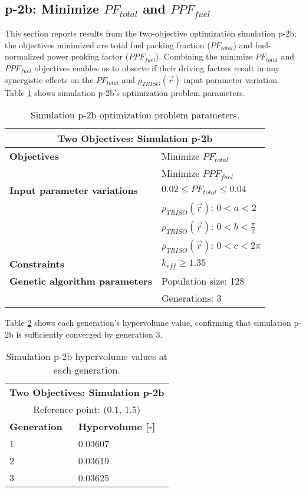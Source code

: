 \subsection{p-2b: Minimize $PF_{total}$ and $PPF_{fuel}$}
\label{sec:p-2b}
This section reports results from the two-objective optimization simulation p-2b; the 
objectives minimized are total fuel packing fraction ($PF_{total}$) and fuel-normalized 
power peaking factor ($PPF_{fuel}$).  
Combining the minimize $PF_{total}$ and $PPF_{fuel}$ objectives enables us to observe if 
their driving factors result in any synergistic effects on the $PF_{total}$ and 
$\rho_{TRISO}(\vec{r})$ input parameter variation. 
Table \ref{tab:simulationp2b} shows simulation p-2b's optimization problem parameters. 
\begin{table}[htbp!]
    \centering
    \onehalfspacing
    \caption{Simulation p-2b optimization problem parameters.}
	\label{tab:simulationp2b}
    \footnotesize
    \begin{tabular}{l|p{4cm}}
    \hline 
    \multicolumn{2}{c}{\textbf{Two Objectives: Simulation p-2b}} \\
    \hline 
    \textbf{Objectives} & Minimize $PF_{total}$ \\
    & Minimize $PPF_{fuel}$ \\
    \hline 
    \textbf{Input parameter variations} & $0.02 \leq PF_{total} \leq 0.04$ \\
    & $\rho_{TRISO}(\vec{r})$: $0<a<2$ \\
    & $\rho_{TRISO}(\vec{r})$: $0<b<\frac{\pi}{2}$ \\
    & $\rho_{TRISO}(\vec{r})$: $0<c<2\pi$ \\
    \hline
    \textbf{Constraints} & $k_{eff} \geq 1.35$\\ 
    \hline 
    \textbf{Genetic algorithm parameters} & Population size: 128 \\
    & Generations: 3 \\
    \hline
    \end{tabular}
\end{table}

Table \ref{tab:p2b-hypervolume} shows each generation's hypervolume value, 
confirming that simulation p-2b is sufficiently converged by generation 3. 
\begin{table}[htbp!]
    \centering
    \onehalfspacing
    \caption{Simulation p-2b hypervolume values at each generation.}
	\label{tab:p2b-hypervolume}
    \footnotesize
    \begin{tabular}{ll}
    \hline 
    \multicolumn{2}{c}{\textbf{Two Objectives: Simulation p-2b}} \\
    \multicolumn{2}{c}{Reference point: (0.1, 1.5)} \\
    \hline 
    \textbf{Generation} & \textbf{Hypervolume [-]} \\
    \hline
    1 & 0.03607 \\
    2 & 0.03619 \\
    3 & 0.03625 \\
    \hline
    \end{tabular}
\end{table}


